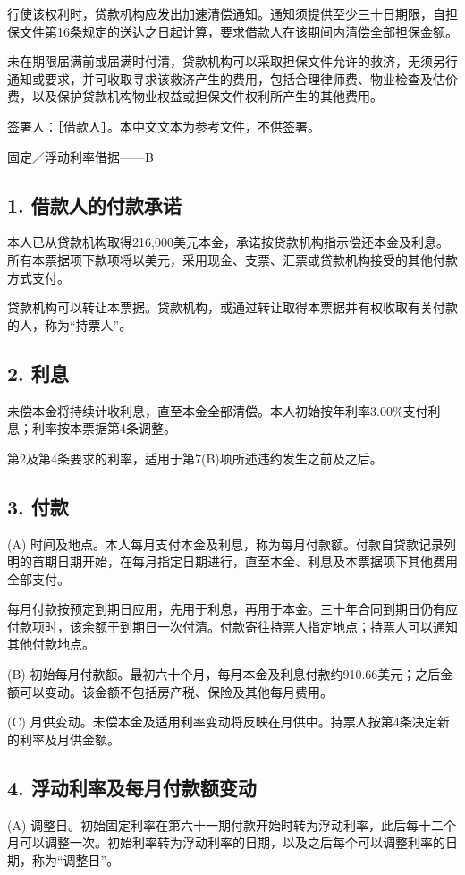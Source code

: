 \documentclass[UTF8,fontset=none,11pt,a4paper]{ctexart}
\begin{document}
行使该权利时，贷款机构应发出加速清偿通知。通知须提供至少三十日期限，自担保文件第16条规定的送达之日起计算，要求借款人在该期间内清偿全部担保金额。


未在期限届满前或届满时付清，贷款机构可以采取担保文件允许的救济，无须另行通知或要求，并可收取寻求该救济产生的费用，包括合理律师费、物业检查及估价费，以及保护贷款机构物业权益或担保文件权利所产生的其他费用。


签署人：［借款人］。本中文文本为参考文件，不供签署。


固定／浮动利率借据——B


\subsection*{1. 借款人的付款承诺}
本人已从贷款机构取得216,000美元本金，承诺按贷款机构指示偿还本金及利息。所有本票据项下款项将以美元，采用现金、支票、汇票或贷款机构接受的其他付款方式支付。


贷款机构可以转让本票据。贷款机构，或通过转让取得本票据并有权收取有关付款的人，称为“持票人”。


\subsection*{2. 利息}
未偿本金将持续计收利息，直至本金全部清偿。本人初始按年利率3.00\%支付利息；利率按本票据第4条调整。


第2及第4条要求的利率，适用于第7(B)项所述违约发生之前及之后。


\subsection*{3. 付款}
(A) 时间及地点。本人每月支付本金及利息，称为每月付款额。付款自贷款记录列明的首期日期开始，在每月指定日期进行，直至本金、利息及本票据项下其他费用全部支付。


每月付款按预定到期日应用，先用于利息，再用于本金。三十年合同到期日仍有应付款项时，该余额于到期日一次付清。付款寄往持票人指定地点；持票人可以通知其他付款地点。


(B) 初始每月付款额。最初六十个月，每月本金及利息付款约910.66美元；之后金额可以变动。该金额不包括房产税、保险及其他每月费用。


(C) 月供变动。未偿本金及适用利率变动将反映在月供中。持票人按第4条决定新的利率及月供金额。


\subsection*{4. 浮动利率及每月付款额变动}
(A) 调整日。初始固定利率在第六十一期付款开始时转为浮动利率，此后每十二个月可以调整一次。初始利率转为浮动利率的日期，以及之后每个可以调整利率的日期，称为“调整日”。
\end{document}
